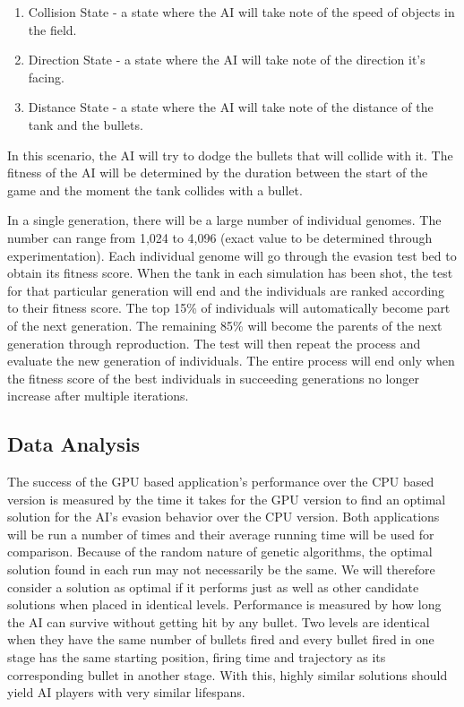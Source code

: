 \begin{enumerate}
 \item Collision State - a state where the AI will take note of the speed 
of objects in the field.
 \item Direction State - a state where the AI will take note 
of the direction it's facing.
 \item Distance State - a state where the AI will
take note of the distance of the tank and the bullets.
\end{enumerate}

In this scenario, the AI will try to dodge the bullets that will collide with
it. The fitness of the AI will be determined by the duration between the start of
the game and the moment the tank collides with a bullet.


In a single generation, there will be a large number of individual genomes. The number
can range from 1,024 to 4,096 (exact value to be determined through experimentation).
Each individual genome will go through the evasion test bed to obtain its fitness score.
When the tank in each simulation has been
shot, the test for that particular generation will end and the individuals are ranked
according to their fitness score. The top 15\% of individuals will automatically become
part of the next generation. The remaining 85\% will become the parents of the next generation 
through reproduction. The test will then repeat the process and evaluate the new
generation of individuals. The entire process will end only when the fitness score
of the best individuals in succeeding generations no longer increase after multiple iterations.


\subsection{Data Analysis}
The success of the GPU based application's performance over the CPU based version is measured
by the time it takes for the GPU version to find an optimal solution for the AI's evasion
behavior over the CPU version. Both applications will be run a number of times and their
average running time will be used for comparison. Because of the random nature of genetic
algorithms, the optimal solution found in each run may not necessarily be the same. We will
therefore consider a solution as optimal if it performs just as well as other candidate
solutions when placed in identical levels. Performance is measured by how long the AI
can survive without getting hit by any bullet. Two levels are identical when they have the
same number of bullets fired and every bullet fired in one stage has the same starting position,
firing time and trajectory as its corresponding bullet in another stage. With this, highly
similar solutions should yield AI players with very similar lifespans.